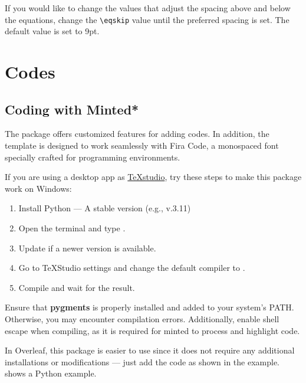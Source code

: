 \documentclass[9pt,a4paper,twocolumn,twoside]{tau-class/tau}
\begin{document}
	\begin{note}
		If you would like to change the values that adjust the spacing above and below the equations, change the \verb|\eqskip| value until the preferred spacing is set. The default value is set to 9pt.
	\end{note}

\section{Codes}

	\subsection{Coding with Minted*}
	
		The  package offers customized features for adding codes. In addition, the template is designed to work seamlessly with Fira Code, a monospaced font specially crafted for programming environments.

        If you are using a desktop app as \href{https://www.texstudio.org/}{TeXstudio}, try these steps to make this package work on Windows:
		
		\begin{enumerate}
			\item Install Python — A stable version (e.g., v.3.11)
			\item Open the terminal and type .
			\item Update if a newer version is available.
			\item Go to TeXStudio settings and change the default compiler to .
			\item Compile and wait for the result.
		\end{enumerate}
        
		\vspace*{-9pt}
        
		\begin{tauenv}[frametitle=Caution]
			Ensure that \textbf{pygments} is properly installed and added to your system’s PATH. Otherwise, you may encounter compilation errors. Additionally, enable shell escape when compiling, as it is required for minted to process and highlight code.
		\end{tauenv}
		
		In Overleaf, this package is easier to use since it does not require any additional installations or modifications — just add the code as shown in the example.  shows a Python example.
		
\end{document}

